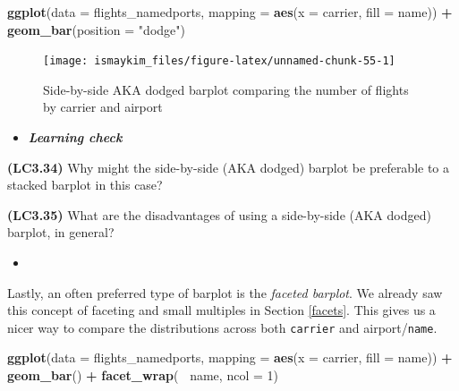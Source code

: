 \documentclass[12pt,]{krantz}
\makeatletter
\newenvironment{Shaded}{\begin{snugshade}}{\end{snugshade}}
\newcommand{\KeywordTok}[1]{\textcolor[rgb]{0.27,0.27,0.27}{\textbf{#1}}}
\newcommand{\DataTypeTok}[1]{\textcolor[rgb]{0.27,0.27,0.27}{#1}}
\newcommand{\DecValTok}[1]{\textcolor[rgb]{0.06,0.06,0.06}{#1}}
\newcommand{\StringTok}[1]{\textcolor[rgb]{0.5,0.5,0.5}{#1}}
\newcommand{\OperatorTok}[1]{\textcolor[rgb]{0.43,0.43,0.43}{\textbf{#1}}}
\newcommand{\NormalTok}[1]{#1}
\newenvironment{kframe}{%
\medskip{}
\setlength{\fboxsep}{.8em}
 \def\at@end@of@kframe{}%
 \ifinner\ifhmode%
  \def\at@end@of@kframe{\end{minipage}}%
  \begin{minipage}{\columnwidth}%
 \fi\fi%
 \def\FrameCommand##1{\hskip\@totalleftmargin \hskip-\fboxsep
 \colorbox{shadecolor}{##1}\hskip-\fboxsep
     \hskip-\linewidth \hskip-\@totalleftmargin \hskip\columnwidth}%
 \MakeFramed {\advance\hsize-\width
   \@totalleftmargin\z@ \linewidth\hsize
   \@setminipage}}%
 {\par\unskip\endMakeFramed%
 \at@end@of@kframe}
\renewenvironment{Shaded}{\begin{kframe}}{\end{kframe}}
\newenvironment{rmdblock}[1]
  {\begin{shaded*}
  \begin{itemize}
  \renewcommand{\labelitemi}{
    \raisebox{-.7\height}[0pt][0pt]{
    }
  }
  \item
  }
  {
  \end{itemize}
  \end{shaded*}
  }
\newenvironment{learncheck}
  {\begin{rmdblock}{warning}}
  {\end{rmdblock}}
\theoremstyle{definition}
\theoremstyle{definition}
\theoremstyle{definition}
\theoremstyle{remark}
\makeatother
\begin{document}
\begin{Shaded}
\begin{Highlighting}[]
\KeywordTok{ggplot}\NormalTok{(}\DataTypeTok{data =}\NormalTok{ flights_namedports, }
       \DataTypeTok{mapping =} \KeywordTok{aes}\NormalTok{(}\DataTypeTok{x =}\NormalTok{ carrier, }\DataTypeTok{fill =}\NormalTok{ name)) }\OperatorTok{+}
\StringTok{  }\KeywordTok{geom_bar}\NormalTok{(}\DataTypeTok{position =} \StringTok{"dodge"}\NormalTok{)}
\end{Highlighting}
\end{Shaded}

\begin{figure}

{\centering \texttt{[image: ismaykim\_files/figure-latex/unnamed-chunk-55-1]} 

}

\caption{Side-by-side AKA dodged barplot comparing the number of flights by carrier and airport}\label{fig:unnamed-chunk-55}
\end{figure}

\begin{learncheck}
\textbf{\emph{Learning check}}
\end{learncheck}

\textbf{(LC3.34)} Why might the side-by-side (AKA dodged) barplot be
preferable to a stacked barplot in this case?

\textbf{(LC3.35)} What are the disadvantages of using a side-by-side
(AKA dodged) barplot, in general?

\begin{learncheck}

\end{learncheck}

Lastly, an often preferred type of barplot is the \emph{faceted
barplot}. We already saw this concept of faceting and small multiples in
Section \ref{facets}. This gives us a nicer way to compare the
distributions across both \texttt{carrier} and airport/\texttt{name}.

\begin{Shaded}
\begin{Highlighting}[]
\KeywordTok{ggplot}\NormalTok{(}\DataTypeTok{data =}\NormalTok{ flights_namedports, }
       \DataTypeTok{mapping =} \KeywordTok{aes}\NormalTok{(}\DataTypeTok{x =}\NormalTok{ carrier, }\DataTypeTok{fill =}\NormalTok{ name)) }\OperatorTok{+}
\StringTok{  }\KeywordTok{geom_bar}\NormalTok{() }\OperatorTok{+}
\StringTok{  }\KeywordTok{facet_wrap}\NormalTok{(}\OperatorTok{~}\StringTok{ }\NormalTok{name, }\DataTypeTok{ncol =} \DecValTok{1}\NormalTok{)}
\end{Highlighting}
\end{Shaded}
\end{document}
